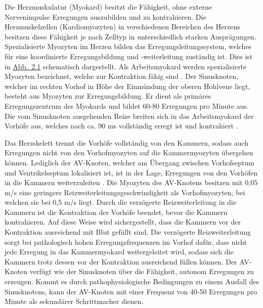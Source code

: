 Die Herzmuskulatur (Myokard) besitzt die Fähigkeit, ohne externe Nervenimpulse Erregungen auszubilden und zu kontrahieren. Die Herzmuskelzellen (Kardiomyozyten) in verschiedenen Bereichen des Herzens besitzen diese Fähigkeit je nach Zelltyp in unterschiedlich starken Ausprägungen. Spezialisierte Myozyten im Herzen bilden das Erregungsleitungssystem, welches für eine koordinierte Erregungsbildung und -weiterleitung zuständig ist. Dies ist in \hyperref[fig:HerzPhys]{Abb.~2.1} schematisch dargestellt. Als Arbeitsmyokard werden spezialisierte Myozyten bezeichnet, welche zur Kontraktion fähig sind \cite{gertsch_ekg_2007}. Der Sinusknoten, welcher im rechten Vorhof in Höhe der Einmündung der oberen Hohlvene liegt, besteht aus Myozyten zur Erregungsbildung. Er dient als primäres Erregungszentrum des Myokards und bildet 60-80 Erregungen pro Minute aus. Die vom Sinusknoten ausgehenden Reize breiten sich in das Arbeitsmyokard der Vorhöfe aus, welches nach ca. 90 ms vollständig erregt ist und kontrahiert \cite{gekle_taschenlehrbuch_2015}. \cite{zilles_anatomie_2010}

Das Herzskelett trennt die Vorhöfe vollständig von den Kammern, sodass auch Erregungen nicht von den Vorhofmyozyten auf die Kammermyozyten übergehen können. Lediglich der \gls{AV-Knoten}, welcher am Übergang zwischen Vorhofseptum und Ventrikelseptum lokalisiert ist, ist in der Lage, Erregungen von den Vorhöfen in die Kammern weiterzuleiten \cite{zilles_anatomie_2010}. Die Myozyten des \gls{AV-Knoten}s besitzen mit 0,05 m/s eine geringere Reizweiterleitungsgeschwindigkeit als Vorhofmyozyten, bei welchen sie bei 0,5 m/s liegt. Durch die verzögerte Reizweiterleitung in die Kammern ist die Kontraktion der Vorhöfe beendet, bevor die Kammern kontrahieren. Auf diese Weise wird sichergestellt, dass die Kammern vor der Kontraktion ausreichend mit Blut gefüllt sind. Die verzögerte Reizweiterleitung sorgt bei pathologisch hohen Erregungsfrequenzen im Vorhof dafür, dass nicht jede Erregung in das Kammermyokard weitergeleitet wird, sodass sich die Kammern trotz dessen vor der Kontraktion ausreichend füllen können.  Der \gls{AV-Knoten} verfügt wie der Sinusknoten über die Fähigkeit, autonom Erregungen zu erzeugen. Kommt es durch pathophysiologische Bedingungen zu einem Ausfall des Sinusknotens, kann der \gls{AV-Knoten} mit einer Frequenz von 40-50 Erregungen pro Minute als sekundärer Schrittmacher dienen. \cite{gekle_taschenlehrbuch_2015} 

